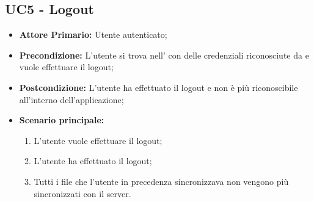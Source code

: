 \subsection{UC5 - Logout}
\begin{itemize}
\item \textbf{Attore Primario:} Utente autenticato;
\item \textbf{Precondizione:} L'utente si trova nell' con delle credenziali riconosciute da  e vuole effettuare il logout;
\item \textbf{Postcondizione:} L'utente ha effettuato il logout e non è più riconoscibile all'interno dell'applicazione;
\item \textbf{Scenario principale:}
    \begin{enumerate}
    \item L'utente vuole effettuare il logout;
    \item L'utente ha effettuato il logout;
    \item Tutti i file che l'utente in precedenza sincronizzava non vengono più sincronizzati con il server.
    \end{enumerate}
\end{itemize}